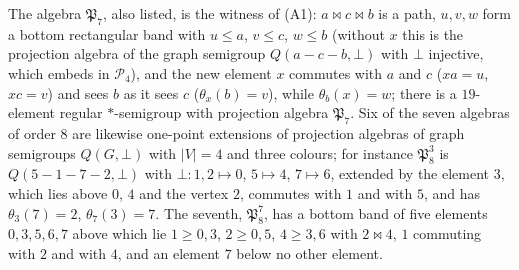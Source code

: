 \documentclass[11pt]{amsart}
\theoremstyle{definition}
\renewcommand{\P}{\mathcal{P}}      %
\newcommand{\mt}{\bowtie}      %
\newcommand{\Rcond}{\textup{(A1)}}     %
\begin{document}
The algebra $\mathfrak P_7$, also listed, is the witness of \Rcond: $a\mt c\mt b$ is a path, $u,v,w$ form a bottom rectangular band with $u\le a$, $v\le c$, $w\le b$ (without $x$ this is the projection algebra of the graph semigroup $Q(a-c-b,\bot)$ with $\bot$ injective, which embeds in $\P_4$), and the new element $x$ commutes with $a$ and $c$ ($xa=u$, $xc=v$) and sees $b$ as it sees $c$ ($\theta_x(b)=v$), while $\theta_b(x)=w$; there is a $19$-element regular $*$-semigroup with projection algebra $\mathfrak P_7$. Six of the seven algebras of order $8$ are likewise one-point extensions of projection algebras of graph semigroups $Q(G,\bot)$ with $|V|=4$ and three colours; for instance $\mathfrak P_8^3$ is $Q(5-1-7-2,\bot)$ with $\bot\colon1,2\mapsto0$, $5\mapsto4$, $7\mapsto6$, extended by the element $3$, which lies above $0$, $4$ and the vertex $2$, commutes with $1$ and with $5$, and has $\theta_3(7)=2$, $\theta_7(3)=7$. The seventh, $\mathfrak P_8^7$, has a bottom band of five elements $0,3,5,6,7$ above which lie $1\ge0,3$, $2\ge0,5$, $4\ge3,6$ with $2\mt4$, $1$ commuting with $2$ and with $4$, and an element $7$ below no other element.
\end{document}
